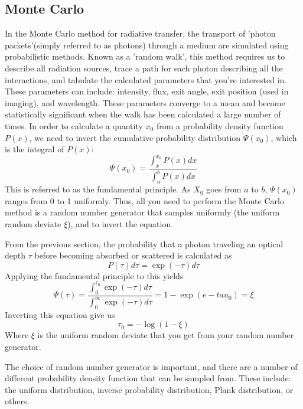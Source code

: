 \documentclass[a4paper]{article}
\begin{document}
\subsection{Monte Carlo}
In the Monte Carlo method for radiative transfer, the transport of 'photon packets'(simply referred to as photons) through a medium are simulated using probabilistic methods. Known as a 'random walk', this method requires us to describe all radiation sources, trace a path for each photon describing all the interactions, and tabulate the calculated parameters that you're interested in. These parameters can include: intensity, flux, exit angle, exit position (used in imaging), and wavelength. These parameters converge to a mean and become statistically significant when the walk has been calculated a large number of times.
In order to calculate a quantity $x_0$ from a probability density function $P(x)$, we need to invert the cumulative probability distribution $\Psi(x_0)$, which is the integral of $P(x)$:
\begin{equation}
\Psi(x_0) = \frac{\int_x ^{x_0} P(x) dx}{\int_a ^b P(x) dx}
\end{equation}
This is referred to as the fundamental principle.
As $X_0$ goes from $a$ to $b$, $\Psi(x_0)$ ranges from 0 to 1 uniformly. Thus, all you need to perform the Monte Carlo method is a random number generator that samples uniformly (the uniform random deviate $\xi$), and to invert the equation.

From the previous section, the probability that a photon traveling an optical depth $\tau$ before becoming absorbed or scattered is calculated as
\begin{equation}
P(\tau) d\tau = \exp(-\tau) d\tau
\end{equation}
Applying the fundamental principle to this yields
\begin{equation}
\Psi (\tau) = \frac{\int_0 ^{\tau_0} \exp(-\tau)d\tau}{\int_0^\infty \exp(-\tau) d\tau} = 1- \exp(e-tau_0) = \xi
\end{equation}
Inverting this equation give us
\begin{equation}
\tau_0 = -\log(1-\xi)
\label{sample}
\end{equation}
Where $\xi$ is the uniform random deviate that you get from your random number generator. 

The choice of random number generator is important, and there are a number of different probability density function that can be sampled from. These include: the uniform distribution, inverse probability distribution, Plank distribution, or others.
\end{document}
